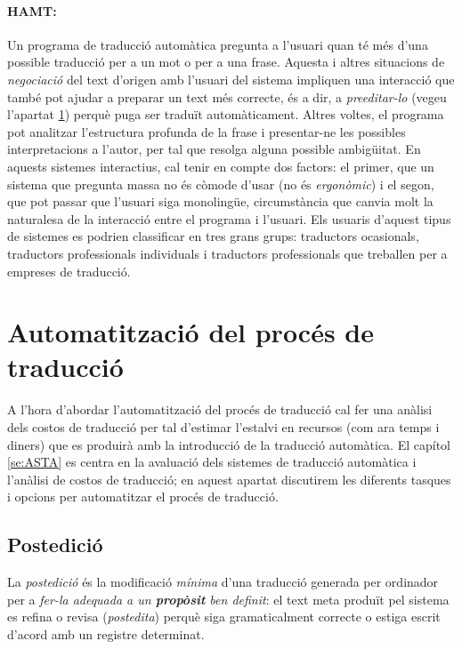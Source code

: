 \paragraph{HAMT:} Un programa de traducció automàtica pregunta a
l'usuari quan té més d'una possible traducció per a un mot o per a una
frase.  Aquesta i altres situacions de \emph{negociació} del text
d'origen amb l'usuari del sistema impliquen una interacció que també
pot ajudar a preparar un text més correcte, és a dir, a
\emph{preeditar-lo} (vegeu l'apartat \ref{ss:preedposted}) perquè puga
ser traduït automàticament. Altres voltes, el programa pot analitzar
l'estructura profunda de la frase i presentar-ne les possibles
interpretacions a l'autor, per tal que resolga alguna possible
ambigüitat. En aquests sistemes interactius, cal tenir en compte dos
factors: el primer, que un sistema que pregunta massa no és còmode
d'usar (no és \emph{ergonòmic}) i el segon, que pot passar que
l'usuari siga monolingüe, circumstància que canvia molt la naturalesa
de la interacció entre el programa i l'usuari.  Els usuaris d'aquest
tipus de sistemes es podrien classificar en tres grans grups:
traductors ocasionals, traductors professionals individuals i
traductors professionals que treballen per a empreses de traducció.

\section{Automatització del procés de traducció}
\label{ss:preedposted}
A l'hora d'abordar l'automatització del procés de traducció cal fer
una anàlisi dels costos de traducció per tal d'estimar l'estalvi en
recursos (com ara temps i diners) que es produirà amb la introducció
de la traducció automàtica. El capítol \ref{se:ASTA} es centra en la
avaluació dels sistemes de traducció automàtica i l'anàlisi de costos
de traducció; en aquest apartat discutirem les diferents tasques i
opcions per automatitzar el procés de traducció.

\subsection{Postedició}
\label{ss:postedicio}
La \emph{postedició} és la modificació \emph{mínima} d'una traducció
generada per ordinador per a \emph{fer-la adequada a un
  \textbf{propòsit} ben definit}: el text meta produït pel sistema es
refina o revisa ({\em postedita}) perquè siga gramaticalment correcte
o estiga escrit d'acord amb un registre determinat.

